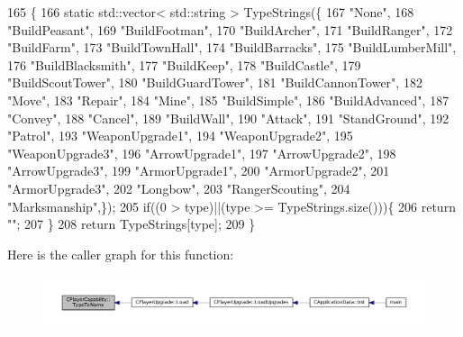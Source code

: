 \begin{DoxyCode}
165                                                                 \{
166     \textcolor{keyword}{static} std::vector< std::string > TypeStrings(\{
167         \textcolor{stringliteral}{"None"},
168         \textcolor{stringliteral}{"BuildPeasant"},
169         \textcolor{stringliteral}{"BuildFootman"},
170         \textcolor{stringliteral}{"BuildArcher"},
171         \textcolor{stringliteral}{"BuildRanger"},
172         \textcolor{stringliteral}{"BuildFarm"},
173         \textcolor{stringliteral}{"BuildTownHall"},
174         \textcolor{stringliteral}{"BuildBarracks"},
175         \textcolor{stringliteral}{"BuildLumberMill"},
176         \textcolor{stringliteral}{"BuildBlacksmith"},
177         \textcolor{stringliteral}{"BuildKeep"},
178         \textcolor{stringliteral}{"BuildCastle"},
179         \textcolor{stringliteral}{"BuildScoutTower"},
180         \textcolor{stringliteral}{"BuildGuardTower"},
181         \textcolor{stringliteral}{"BuildCannonTower"},
182         \textcolor{stringliteral}{"Move"},
183         \textcolor{stringliteral}{"Repair"},
184         \textcolor{stringliteral}{"Mine"},
185         \textcolor{stringliteral}{"BuildSimple"},
186         \textcolor{stringliteral}{"BuildAdvanced"},
187         \textcolor{stringliteral}{"Convey"},
188         \textcolor{stringliteral}{"Cancel"},
189         \textcolor{stringliteral}{"BuildWall"},
190         \textcolor{stringliteral}{"Attack"},
191         \textcolor{stringliteral}{"StandGround"},
192         \textcolor{stringliteral}{"Patrol"},
193         \textcolor{stringliteral}{"WeaponUpgrade1"},
194         \textcolor{stringliteral}{"WeaponUpgrade2"},
195         \textcolor{stringliteral}{"WeaponUpgrade3"},
196         \textcolor{stringliteral}{"ArrowUpgrade1"},
197         \textcolor{stringliteral}{"ArrowUpgrade2"},
198         \textcolor{stringliteral}{"ArrowUpgrade3"},
199         \textcolor{stringliteral}{"ArmorUpgrade1"},
200         \textcolor{stringliteral}{"ArmorUpgrade2"},
201         \textcolor{stringliteral}{"ArmorUpgrade3"},
202         \textcolor{stringliteral}{"Longbow"},
203         \textcolor{stringliteral}{"RangerScouting"},
204         \textcolor{stringliteral}{"Marksmanship"},\});
205     \textcolor{keywordflow}{if}((0 > type)||(type >= TypeStrings.size()))\{
206         \textcolor{keywordflow}{return} \textcolor{stringliteral}{""};
207     \}
208     \textcolor{keywordflow}{return} TypeStrings[type];
209 \}
\end{DoxyCode}
Here is the caller graph for this function\+:\nopagebreak
\begin{figure}[H]
\begin{center}
\leavevmode
\includegraphics[width=350pt]{classCPlayerCapability_a976f05b7e620b721bdb5051debc9b93d_icgraph}
\end{center}
\end{figure}


